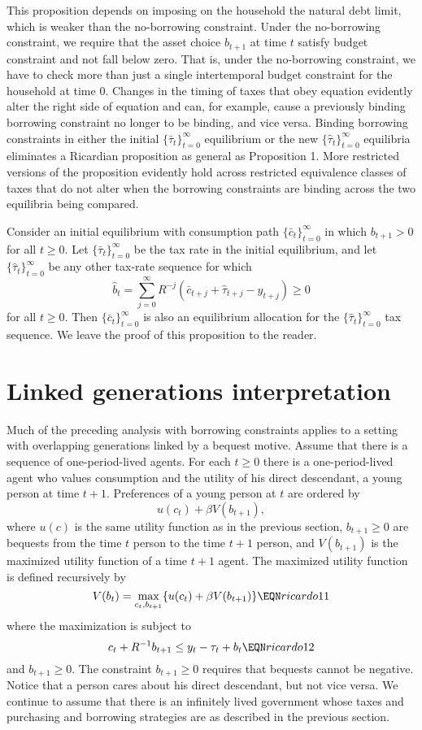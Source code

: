 \medskip

This proposition depends on imposing  on the household  the natural debt limit,
which is weaker than the no-borrowing constraint.
Under the no-borrowing constraint, we require that the asset choice
$b_{t+1}$ at time $t$ satisfy budget constraint 
and  not fall below zero. That is, under the no-borrowing constraint,
we have to check more than just a single  intertemporal budget
constraint for the household at time $0$.
Changes in the timing of taxes that
obey equation  evidently alter the right side of
equation 
and can, for example, cause a previously binding
 borrowing constraint no longer
to  be binding, and  vice versa.
Binding borrowing constraints in either the initial
$\{\bar \tau_t\}_{t=0}^\infty$ equilibrium or the new $\{\hat \tau_t\}_{t=0}^\infty$ equilibria eliminates
a Ricardian proposition as general as Proposition 1.
More restricted versions of the proposition evidently hold across restricted
equivalence classes of taxes that do not alter when the borrowing
constraints are binding
across the two equilibria being compared.


\medskip
{}  Consider an initial equilibrium
with consumption path $\{\bar c_t\}_{t=0}^\infty$
in which $b_{t+1} >0$ for all $t \geq 0$.  Let $\{\bar \tau_t \}_{t=0}^\infty$
be the tax  rate in the initial equilibrium, and let
$\{\hat \tau_t\}_{t=0}^\infty$ be any other tax-rate sequence for which
$$ \hat b_t = \sum_{j=0}^\infty R^{-j} (\bar c_{t+j} +
\hat \tau_{t+j} - y_{t+j}) \geq 0 $$
for all $t \geq 0$.  Then
$\{\bar  c_t\}_{t=0}^\infty$ is also an equilibrium allocation
for the $\{\hat \tau_t\}_{t=0}^\infty$ tax sequence.
\medskip
We leave the proof of this proposition to the reader.
\section{Linked generations interpretation}

  Much of the
preceding analysis with borrowing constraints applies to a setting
with overlapping generations linked by a bequest motive.
Assume that there is a sequence of  one-period-lived agents.
For each $t\geq 0$ there is a one-period-lived agent who
values consumption and the utility of his direct descendant, a young
person at time $t+1$.  Preferences of a young person at $t$ are
ordered by
$$  u(c_t)  + \beta V(b_{t+1}), $$
where $u(c)$ is the same utility function
as in the previous section,
$b_{t+1}\geq 0$  are bequests from the  time $t$   person to
the time $t+1$ person, and $V(b_{t+1})$ is the maximized utility
function of a time $t+1$ agent.   The maximized utility function
is defined recursively by
$$ V(b_t) =  \max_{c_t, b_{t+1}} \{u(c_t) + \beta V(b_{t+1}) \} \EQN ricardo11$$
where the maximization is subject to
$$ c_t + R^{-1} b_{t+1} \leq y_t -\tau_t + b_t\EQN ricardo12$$
and $b_{t+1} \geq 0$.   The constraint $b_{t+1} \geq 0$ requires that
bequests cannot be negative.   Notice that a person cares about
his direct descendant, but not vice versa.
We continue to assume that there is an infinitely lived government
whose taxes and purchasing and borrowing strategies are as described in
the previous section.

